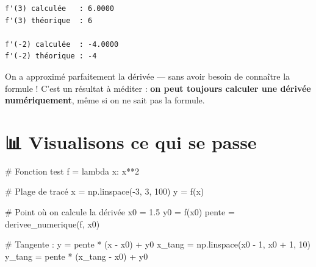 \documentclass[
  french,
  11pt,
  a4paper,
]{scrbook}
\newenvironment{Shaded}{}{}
\newcommand{\CommentTok}[1]{\textcolor[rgb]{0.42,0.45,0.49}{#1}}
\newcommand{\DecValTok}[1]{\textcolor[rgb]{0.00,0.36,0.77}{#1}}
\newcommand{\FloatTok}[1]{\textcolor[rgb]{0.00,0.36,0.77}{#1}}
\newcommand{\KeywordTok}[1]{\textcolor[rgb]{0.84,0.23,0.29}{#1}}
\newcommand{\NormalTok}[1]{\textcolor[rgb]{0.14,0.16,0.18}{#1}}
\newcommand{\OperatorTok}[1]{\textcolor[rgb]{0.14,0.16,0.18}{#1}}
\begin{document}
\begin{verbatim}
f'(3) calculée   : 6.0000
f'(3) théorique  : 6

f'(-2) calculée  : -4.0000
f'(-2) théorique : -4
\end{verbatim}

On a approximé parfaitement la dérivée --- sans avoir besoin de
connaître la formule ! C'est un résultat à méditer : \textbf{on peut
toujours calculer une dérivée numériquement}, même si on ne sait pas la
formule.

\section{📊 Visualisons ce qui se
passe}\label{visualisons-ce-qui-se-passe}

\begin{Shaded}
\begin{Highlighting}[]
\CommentTok{\# Fonction test}
\NormalTok{f }\OperatorTok{=} \KeywordTok{lambda}\NormalTok{ x: x}\OperatorTok{**}\DecValTok{2}

\CommentTok{\# Plage de tracé}
\NormalTok{x }\OperatorTok{=}\NormalTok{ np.linspace(}\OperatorTok{{-}}\DecValTok{3}\NormalTok{, }\DecValTok{3}\NormalTok{, }\DecValTok{100}\NormalTok{)}
\NormalTok{y }\OperatorTok{=}\NormalTok{ f(x)}

\CommentTok{\# Point où on calcule la dérivée}
\NormalTok{x0 }\OperatorTok{=} \FloatTok{1.5}
\NormalTok{y0 }\OperatorTok{=}\NormalTok{ f(x0)}
\NormalTok{pente }\OperatorTok{=}\NormalTok{ derivee\_numerique(f, x0)}

\CommentTok{\# Tangente : y = pente * (x {-} x0) + y0}
\NormalTok{x\_tang }\OperatorTok{=}\NormalTok{ np.linspace(x0 }\OperatorTok{{-}} \DecValTok{1}\NormalTok{, x0 }\OperatorTok{+} \DecValTok{1}\NormalTok{, }\DecValTok{10}\NormalTok{)}
\NormalTok{y\_tang }\OperatorTok{=}\NormalTok{ pente }\OperatorTok{*}\NormalTok{ (x\_tang }\OperatorTok{{-}}\NormalTok{ x0) }\OperatorTok{+}\NormalTok{ y0}


\end{Highlighting}
\end{Shaded}
\end{document}
